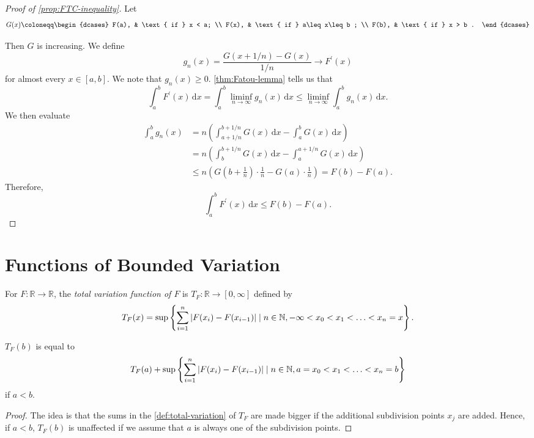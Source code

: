 \begin{proof}[Proof of \autoref{prop:FTC-inequality}]
	Let
	\[
		G(x)\coloneqq \begin{dcases}
			F(a), & \text{ if } x < a;          \\
			F(x), & \text{ if } a\leq x\leq b ; \\
			F(b), & \text{ if } x > b .
		\end{dcases}
	\]

	Then \(G\) is increasing. We define
	\[
		g_n(x) = \frac{G(x+1/n)- G(x)}{1/n} \to F^\prime (x)
	\]
	for almost every \(x \in [a,b]\). We note that \(g_n(x) \geq 0\). \autoref{thm:Fatou-lemma} tells us that
	\[
		\int_a^b F^\prime (x) \,\mathrm{d} x = \int_a^b \liminf_{n \to \infty} g_n(x) \,\mathrm{d} x \leq \liminf_{n \to \infty} \int_a^b g_n(x) \,\mathrm{d} x.
	\]
	We then evaluate
	\[
		\begin{split}
			\int_a^b g_n(x) &= n\left( \int_{a+1/n}^{b+1/n} G(x) \,\mathrm{d} x - \int_a^b G(x) \,\mathrm{d} x \right)  \\
			&= n\left( \int_b^{b+1/n} G(x) \,\mathrm{d} x - \int_a^{a+1/n} G(x) \,\mathrm{d} x \right) \\
			&\leq n\left( G\left( b + \frac{1}{n} \right) \cdot \frac{1}{n} - G(a) \cdot \frac{1}{n}  \right)
			= F(b) - F(a).
		\end{split}
	\]
	Therefore,
	\[
		\int_a^b F^\prime (x) \,\mathrm{d} x \leq F(b) - F(a).
	\]
\end{proof}

\section{Functions of Bounded Variation}
\begin{definition}\label{def:total-variation-function}
	For \(F \colon \mathbb{R} \to \mathbb{R}\), the \emph{total variation function of \(F\)} is \(T_F \colon \mathbb{R} \to [0,\infty]\) defined by
	\[
		T_F(x) = \sup \left\{\sum_{i=1}^n \left\vert F(x_i) - F(x_{i-1}) \right\vert \mid n \in \mathbb{\MakeUppercase{n}}, -\infty < x_0 < x_1 < \ldots < x_n = x\right\}.
	\]
\end{definition}

\begin{lemma}
	\(T_F(b)\) is equal to
	\[
		T_F(a) + \sup \left\{\sum_{i=1}^n \left\vert F(x_i) - F(x_{i-1}) \right\vert \mid n \in \mathbb{\MakeUppercase{n}}, a = x_0 < x_1 < \ldots < x_n = b\right\}
	\]
	if \(a < b\).
\end{lemma}
\begin{proof}
	The idea is that the sums in the \autoref{def:total-variation} of \(T_F\) are made bigger if the additional subdivision points \(x_{j} \) are added. Hence,
	if \(a <b\), \(T_F(b)\) is unaffected if we assume that \(a\) is always one of the subdivision points.
\end{proof}

